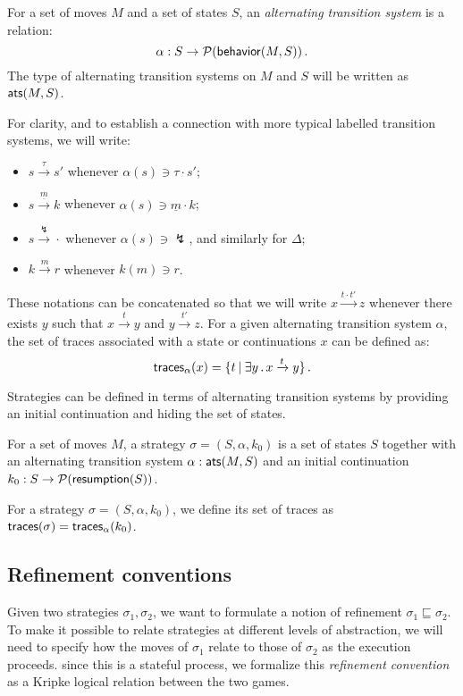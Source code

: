 \begin{definition}
For a set of moves $M$ and a set of states $S$,
an \emph{alternating transition system} is a relation:
\[
  \alpha : S \rightarrow \mathcal{P}( \mathsf{behavior} (M, S)) \,.
\]
The type of alternating transition systems on $M$ and $S$
will be written as $ \mathsf{ats} (M, S)$.
\end{definition}

For clarity,
and to establish a connection with more typical
labelled transition systems,
we will write:
\begin{itemize}
\item $s \xrightarrow{\tau} s'$ whenever $\alpha(s) \ni \tau \cdot s'$;
\item $s \xrightarrow{\underline{m}} k$
	whenever $\alpha(s) \ni \underline{m} \cdot k$;
\item $s \xrightarrow{\lightning} {\cdot}$
	whenever $\alpha(s) \ni \lightning$,
	and similarly for $\Delta$;
\item $k \xrightarrow{m} r$ whenever $k(m) \ni r$.
\end{itemize}
These notations can be concatenated so that
we will write $x \xrightarrow{t \cdot t'} z$
whenever there exists $y$ such that $x \xrightarrow{t} y$ and
$y \xrightarrow{t'} z$.
For a given alternating transition system $\alpha$,
the set of traces associated with a state or continuations $x$
can be defined as:
\[
     \mathsf{traces} _\alpha(x) =
	\{ t \:|\: \exists y \,.\, x \xrightarrow{t} y \} \,.
\]

Strategies can be defined in terms of alternating transition systems
by providing an initial continuation and hiding the set of states.

\begin{definition}[Strategy]
For a set of moves $M$,
a strategy $\sigma = (S, \alpha, k_0)$
is a set of states $S$ together with
an alternating transition system $\alpha :  \mathsf{ats} (M, S)$ and
an initial continuation $k_0 : S \rightarrow \mathcal{P}( \mathsf{resumption} (S))$.
\end{definition}

For a strategy $\sigma = (S, \alpha, k_0)$,
we define its set of traces as
$ \mathsf{traces} (\sigma) =  \mathsf{traces} _\alpha (k_0)$.

\subsection{Refinement conventions}

Given two strategies $\sigma_1, \sigma_2$,
we want to formulate a notion of refinement
$\sigma_1 \sqsubseteq \sigma_2$.
To make it possible to relate strategies at different
levels of abstraction,
we will need to specify how the moves of $\sigma_1$
relate to those of $\sigma_2$
as the execution proceeds.
since this is a stateful process,
we formalize this \emph{refinement convention}
as a Kripke logical relation between the two games.


